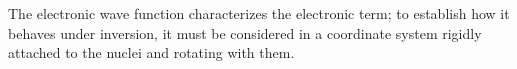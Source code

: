 The electronic wave function characterizes the electronic term; to establish how it behaves under inversion, it must be considered in a coordinate system rigidly attached to the nuclei and rotating with them.
